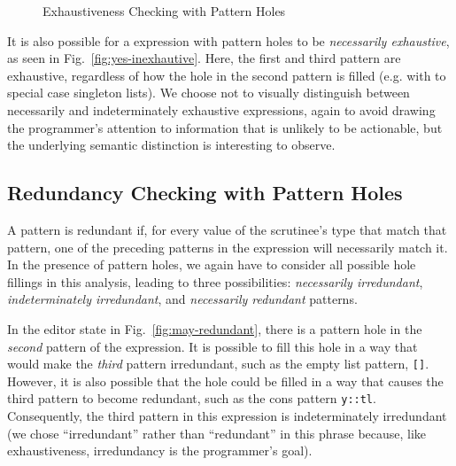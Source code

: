 \begin{figure}
{}
\hfil
  \caption{Exhaustiveness Checking with Pattern Holes}
  \label{fig:exhaustiveness}
\end{figure}

It is also possible for a  expression with pattern holes to be \emph{necessarily exhaustive}, as seen in Fig.~\ref{fig:yes-inexhautive}. Here, the first and third pattern are
exhaustive, regardless of how the hole in the second pattern is filled (e.g. with \li{[]} to special case singleton lists). We choose not to visually distinguish between necessarily and indeterminately exhaustive  expressions, again to avoid drawing
the programmer's attention to information that is unlikely to be actionable, but the
underlying semantic distinction is interesting to observe.

\subsection{Redundancy Checking with Pattern Holes}
\label{sec:hazel-redundancy}
A pattern is redundant if, for every value of the scrutinee's type that match that pattern, one of the preceding patterns in the  expression will necessarily 
match it. In the presence of pattern holes, we again have to consider all possible hole fillings in this analysis, leading to three possibilities: \emph{necessarily irredundant}, \emph{indeterminately irredundant}, and \emph{necessarily redundant} patterns.

In the editor state in Fig.~\ref{fig:may-redundant}, there is a pattern hole in the \emph{second} pattern of the  expression. It is possible to fill this hole in a way that would make the \emph{third} pattern irredundant, such as the empty list pattern, \texttt{[]}. 
However, it is also possible that the hole could be filled in a way that causes the third pattern to become redundant, such as the cons pattern \texttt{y::tl}. Consequently, the third pattern in this  expression is indeterminately irredundant (we chose ``irredundant'' rather than ``redundant'' in this phrase because, like exhaustiveness, irredundancy is the programmer's goal).

